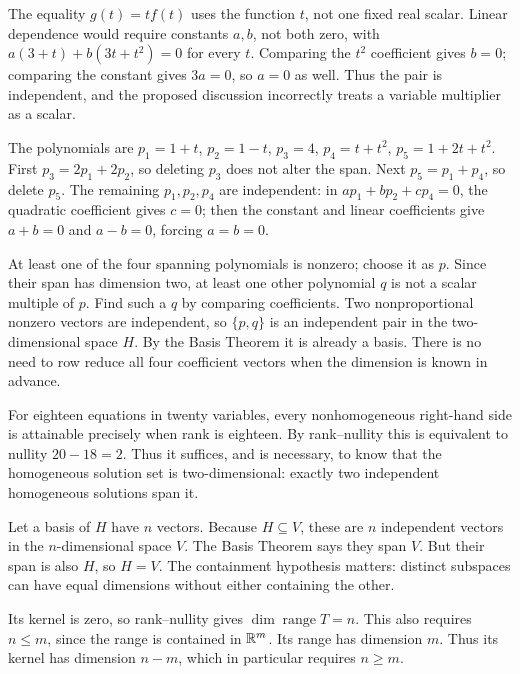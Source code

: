The equality $g(t)=tf(t)$ uses the function $t$, not one fixed real scalar.
Linear dependence would require constants $a,b$, not both zero, with
$a(3+t)+b(3t+t^2)=0$ for every $t$.
Comparing the $t^2$ coefficient gives $b=0$; comparing the constant gives
$3a=0$, so $a=0$ as well. Thus the pair is independent, and the proposed
discussion incorrectly treats a variable multiplier as a scalar.

The polynomials are $p_1=1+t$, $p_2=1-t$, $p_3=4$,
$p_4=t+t^2$, $p_5=1+2t+t^2$.
First $p_3=2p_1+2p_2$, so deleting $p_3$ does not alter the span.
Next $p_5=p_1+p_4$, so delete $p_5$.
The remaining $p_1,p_2,p_4$ are independent: in
$ap_1+bp_2+cp_4=0$, the quadratic coefficient gives $c=0$;
then the constant and linear coefficients give $a+b=0$ and $a-b=0$,
forcing $a=b=0$.

At least one of the four spanning polynomials is nonzero; choose it as $p$.
Since their span has dimension two, at least one other polynomial $q$ is
not a scalar multiple of $p$. Find such a $q$ by comparing coefficients.
Two nonproportional nonzero vectors are independent, so $\{p,q\}$ is an
independent pair in the two-dimensional space $H$. By the Basis Theorem
it is already a basis. There is no need to row reduce all four coefficient
vectors when the dimension is known in advance.

For eighteen equations in twenty variables, every nonhomogeneous right-hand
side is attainable precisely when rank is eighteen. By rank--nullity this
is equivalent to nullity $20-18=2$. Thus it suffices, and is necessary, to
know that the homogeneous solution set is two-dimensional: exactly two
independent homogeneous solutions span it.

Let a basis of $H$ have $n$ vectors. Because $H\subseteq V$, these are
$n$ independent vectors in the $n$-dimensional space $V$.
The Basis Theorem says they span $V$. But their span is also $H$, so $H=V$.
The containment hypothesis matters: distinct subspaces can have equal
dimensions without either containing the other.

Its kernel is zero, so rank--nullity gives $\dim\operatorname{range}T=n$.
This also requires $n\le m$, since the range is contained in $\mathbb{R}^m$.
Its range has dimension $m$. Thus its kernel has dimension $n-m$,
which in particular requires $n\ge m$.

